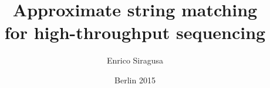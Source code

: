 \documentclass[nocenter,twoside,a4paper,12pt,crosshair,upper,bold,final]{thesis}
\newcommand{\clearemptydoublepage}{\newpage{\pagestyle{empty}\cleardoublepage}}
\begin{document}
 


\frontmatter


\title{Approximate string matching \\for high-throughput sequencing} %

\author{Enrico Siragusa}






\lowertitleback{
Datum des Disputation: \emph{\textbf{08.07.2015}}\\[1ex]
Gutachter:\\
\emph{\textbf{Prof. Dr. Knut Reinert}, Freie Universit"at Berlin, Deutschland}\\
\emph{\textbf{Prof. Dr. Raffaele Giancarlo}, Universit\`a degli Studi di Palermo, Italien}\\
}
\date{Berlin 2015}

\maketitle
\clearemptydoublepage

\setcounter{page}{5}





\clearemptydoublepage
\end{document}
